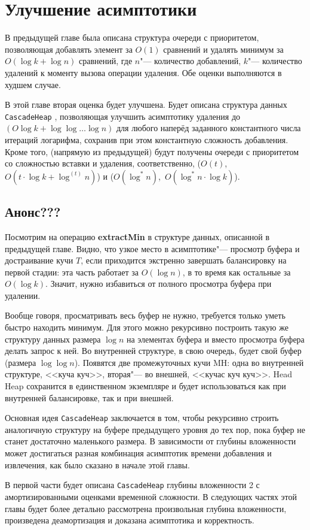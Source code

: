 \chapter{Улучшение асимптотики}

\newcommand{\CH}{\texttt{CascadeHeap} }

В предыдущей главе была описана структура очереди с приоритетом, позволяющая
добавлять элемент за $O(1)$ сравнений и удалять минимум за $O(\log k + \log n)$
сравнений, где $n$"--- количество добавлений, $k$"--- количество удалений
к моменту вызова операции удаления. Обе оценки выполняются в худшем случае.

В этой главе вторая оценка будет улучшена.  Будет описана структура данных \CH,
позволяющая улучшить асимптотику удаления до $(O\log k + \log \log \dots \log n)$
для любого наперёд заданного константного числа итераций логарифма, сохранив при
этом константную сложность добавления. Кроме того, (напрямую из предыдущей)
будут получены очереди с приоритетом со сложностью вставки и удаления,
соответственно, ($O(t)$,~$O(t \cdot \log k + \log ^{(t)} n)$) и
($O(\log^* n)$,~$O(\log^* n \cdot \log k)$).

\section*{Анонс???}

Посмотрим на операцию \textbf{extractMin} в структуре данных, описанной в предыдущей
главе. Видно, что узкое место в асимптотике"--- просмотр буфера и достраивание
кучи $T$, если приходится экстренно завершать балансировку на первой стадии:
эта часть работает за $O(\log n)$, в то время как остальные за $O(\log k)$.
Значит, нужно избавиться от полного просмотра буфера при удалении.

Вообще говоря, просматривать весь буфер не нужно, требуется только уметь быстро
находить минимум. Для этого можно рекурсивно построить такую же структуру данных
размера $\log n$ на элементах буфера и вместо просмотра буфера делать запрос к ней.
Во внутренней структуре, в свою очередь, будет свой буфер (размера $\log \log n$).
Появятся две промежуточных кучи MH: одна во внутренней структуре, <<куча куч>>,
вторая"--- во внешней, <<кучас куч куч>>. Head Heap сохранится в единственном
экземпляре и будет использоваться как при внутренней балансировке, так и при внешней.

Основная идея \CH заключается в том, чтобы рекурсивно строить аналогичную
структуру на буфере предыдущего уровня до тех пор, пока буфер не станет достаточно
маленького размера. В зависимости от глубины вложенности может достигаться
разная комбинация асимптотик времени добавления и извлечения, как было сказано
в начале этой главы.

В первой части будет описана \CH глубины вложенности 2 с амортизированными оценками
временной сложности. В следующих частях этой главы будет более детально рассмотрена
произвольная глубина вложенности, произведена деамортизация и доказана асимптотика
и корректность.
